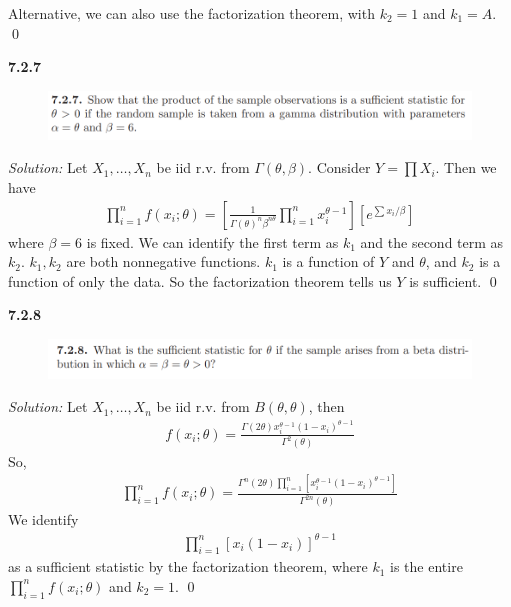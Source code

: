 \documentclass{book}
\theoremstyle{definition}
\newcommand{\be}{\beta}
\newcommand{\f}[2]{\frac{#1}{#2}}
\newcommand{\lb}{\left[}
\newcommand{\rb}{\right]}
\begin{document}
Alternative, we can also use the factorization theorem, with $k_2 = 1$ and $k_1 = A$. \qed



\newpage


\noindent\textbf{7.2.7}
\begin{figure}[!htb]
	\centering
	\includegraphics[scale=1]{727}
\end{figure}




\noindent \textit{Solution:} Let $X_1,\dots, X_n$ be iid r.v. from $\Gamma(\theta,\be)$. Consider $Y = \prod X_i$. Then we have
\begin{align*}
\prod^n_{i=1} f(x_i;\theta) = \lb \f{1}{\Gamma(\theta)^n \beta^{n\theta}}\prod^n_{i=1}x_i^{\theta-1}\rb \lb  e^{\sum x_i/\beta} \rb
\end{align*} 
where $\beta = 6$ is fixed. We can identify the first term as $k_1$ and the second term as $k_2$. $k_1, k_2$ are both nonnegative functions. $k_1$ is a function of $Y$ and $\theta$, and $k_2$ is a function of only the data. So the factorization theorem tells us $Y$ is sufficient. \qed



\newpage



\noindent\textbf{7.2.8}
\begin{figure}[!htb]
	\centering
	\includegraphics[scale=1]{728}
\end{figure}



\noindent \textit{Solution:} Let $X_1,\dots,X_n$ be iid r.v. from $B(\theta,\theta)$, then 
\begin{align}
f(x_i;\theta) = \f{\Gamma(2\theta)x_i^{\theta-1}(1-x_i)^{\theta-1}}{\Gamma^2(\theta)}
\end{align}
So,
\begin{align}
\prod^n_{i=1}f(x_i;\theta) = \f{\Gamma^n(2\theta)\prod^n_{i=1}\lb x_i^{\theta-1}(1-x_i)^{\theta-1}\rb}{\Gamma^{2n}(\theta)}
\end{align}
We identify
\begin{align*}
\prod^n_{i=1} \lb x_i(1-x_i) \rb^{\theta-1}
\end{align*}
as a sufficient statistic by the factorization theorem, where $k_1$ is the entire $\prod^n_{i=1}f(x_i;\theta)$ and $k_2 = 1$. \qed
\end{document}
